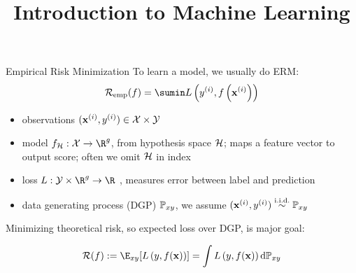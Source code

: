 \documentclass[11pt,compress,t,notes=noshow, xcolor=table]{beamer}
\title{Introduction to Machine Learning}
\begin{document}
    

\begin{frame}{Empirical Risk Minimization}
To learn a model, we usually do ERM:
$$\riskef = \sumin \Lxyi$$
\vfill
{\small
\begin{itemize}\setlength\itemsep{0.5pt} 
    \item observations $(\mathbf{x}^{(i)}, y^{(i)}) \in  \mathcal{X} \times \mathcal{Y}$
    \item model $f_{\Hspace}:\Xspace \rightarrow \R^g$, 
    from hypothesis space $\mathcal{H}$;
    maps a feature vector to output score;
    often we omit $\mathcal{H}$ in index 
    \item loss $L:\Yspace\times\R^g\rightarrow\R$ ,
    measures error between label and prediction
    \item data generating process (DGP) $\mathbb{P}_{xy}$, we assume %
    $(\mathbf{x}^{(i)}, y^{(i)})  \overset{\text{i.i.d.}}{\sim} \mathbb{P}_{xy}$    
\end{itemize}
}
Minimizing theoretical risk, so expected loss over DGP, is major goal:

$$ \risk (f) := \E_{xy} [\Lxy] = \int \Lxy \text{d}\Pxy $$
\end{frame}
\end{document}
